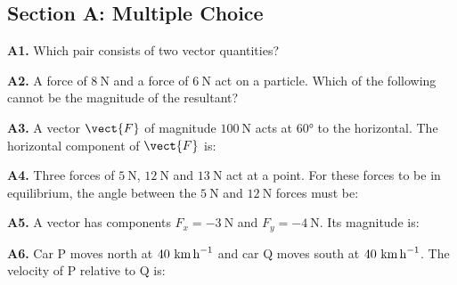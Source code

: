 \begin{exercisebox}[2]

\subsection*{Section A: Multiple Choice}

\textbf{A1.} Which pair consists of two vector quantities?


\vspace{0.4cm}

\textbf{A2.} A force of $8\ \text{N}$ and a force of
$6\ \text{N}$ act on a particle. Which of the following
cannot be the magnitude of the resultant?


\vspace{0.4cm}

\textbf{A3.} A vector $\vect{F}$ of magnitude $100\ \text{N}$
acts at $60°$ to the horizontal. The horizontal component
of $\vect{F}$ is:


\vspace{0.4cm}

\textbf{A4.} Three forces of $5\ \text{N}$, $12\ \text{N}$
and $13\ \text{N}$ act at a point. For these forces to be
in equilibrium, the angle between the $5\ \text{N}$ and
$12\ \text{N}$ forces must be:


\vspace{0.4cm}

\textbf{A5.} A vector has components
$F_x = -3\ \text{N}$ and $F_y = -4\ \text{N}$.
Its magnitude is:


\vspace{0.4cm}

\textbf{A6.} Car P moves north at $40\ \text{km\,h}^{-1}$
and car Q moves south at $40\ \text{km\,h}^{-1}$. The
velocity of P relative to Q is:


\end{exercisebox}
